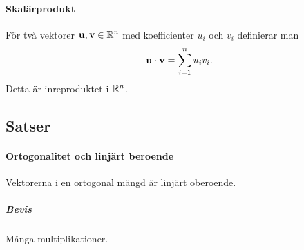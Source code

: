 \paragraph{Skalärprodukt}
För två vektorer $\vect{u}, \vect{v}\in\R^n$ med koefficienter $u_i$ och $v_i$ definierar man
\begin{align*}
	\vect{u}\cdot\vect{v} = \sum\limits_{i = 1}^n u_iv_i.
\end{align*}
Detta är inreproduktet i $\mathbb{R}^n$.

\subsection{Satser}

\paragraph{Ortogonalitet och linjärt beroende}
Vektorerna i en ortogonal mängd är linjärt oberoende.

\subparagraph{Bevis}
Många multiplikationer.
